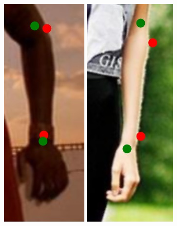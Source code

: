 \begin{figure}[!t]
    \includegraphics[height=\fh]{resources/Annotation_Correction/Fixing/fix_3}
    \hfill
    \includegraphics[height=\fh]{resources/Annotation_Correction/Fixing/fix_5}
    \hfill

\end{figure}

